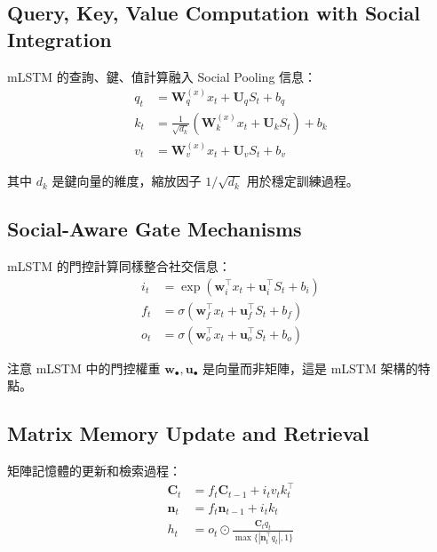 \documentclass[11pt,a4paper]{article}
\begin{document}
\subsection{Query, Key, Value Computation with Social Integration}

mLSTM 的查詢、鍵、值計算融入 Social Pooling 信息：
\begin{align}
q_t &= \mathbf{W}_q^{(x)} x_t + \mathbf{U}_q S_t + b_q \label{eq:mlstm_query} \\
k_t &= \frac{1}{\sqrt{d_k}} \left(\mathbf{W}_k^{(x)} x_t + \mathbf{U}_k S_t\right) + b_k \label{eq:mlstm_key} \\
v_t &= \mathbf{W}_v^{(x)} x_t + \mathbf{U}_v S_t + b_v \label{eq:mlstm_value}
\end{align}

其中 $d_k$ 是鍵向量的維度，縮放因子 $1/\sqrt{d_k}$ 用於穩定訓練過程。

\subsection{Social-Aware Gate Mechanisms}

mLSTM 的門控計算同樣整合社交信息：
\begin{align}
i_t &= \exp(\mathbf{w}_i^{\top} x_t + \mathbf{u}_i^{\top} S_t + b_i) \label{eq:mlstm_input_gate} \\
f_t &= \sigma(\mathbf{w}_f^{\top} x_t + \mathbf{u}_f^{\top} S_t + b_f) \label{eq:mlstm_forget_gate} \\
o_t &= \sigma(\mathbf{w}_o^{\top} x_t + \mathbf{u}_o^{\top} S_t + b_o) \label{eq:mlstm_output_gate}
\end{align}

注意 mLSTM 中的門控權重 $\mathbf{w}_{\bullet}, \mathbf{u}_{\bullet}$ 是向量而非矩陣，這是 mLSTM 架構的特點。

\subsection{Matrix Memory Update and Retrieval}

矩陣記憶體的更新和檢索過程：
\begin{align}
\mathbf{C}_t &= f_t \mathbf{C}_{t-1} + i_t v_t k_t^{\top} \label{eq:mlstm_matrix_update} \\
\mathbf{n}_t &= f_t \mathbf{n}_{t-1} + i_t k_t \label{eq:mlstm_norm_vector_update} \\
h_t &= o_t \odot \frac{\mathbf{C}_t q_t}{\max\{|\mathbf{n}_t^{\top} q_t|, 1\}} \label{eq:mlstm_output}
\end{align}
\end{document}
